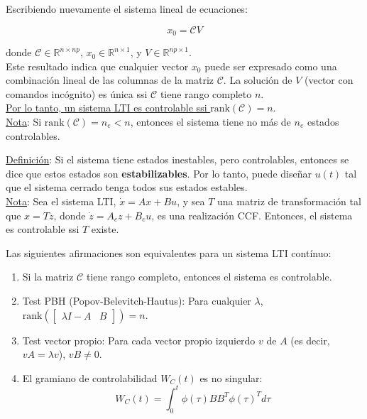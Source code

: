 Escribiendo nuevamente el sistema lineal de ecuaciones:

$$x_0 = \mathcal{C} V$$

\noindent donde $\mathcal{C} \in \mathbb{R}^{n \times np}$, $x_0 \in \mathbb{R}^{n \times 1}$, y $V \in \mathbb{R}^{np \times 1}$.\\

Este resultado indica que cualquier vector $x_0$ puede ser expresado como una combinación lineal de las columnas de la matriz $\mathcal{C}$. La solución de $V$ (vector con comandos incógnito) es única ssi  $\mathcal{C}$ tiene rango completo $n$.\\

\underline{Por lo tanto, un sistema LTI es controlable ssi $\text{rank}(\mathcal{C})=n$}. \\

\underline{Nota}: Si $\text{rank}(\mathcal{C})= n_e < n$, entonces el sistema tiene no más de $n_e$ estados controlables.\\
\par \underline{Definición}: Si el sistema tiene estados inestables, pero controlables, entonces se dice que estos estados son \textbf{estabilizables}. Por lo tanto, puede diseñar $u(t)$ tal que el sistema cerrado tenga todos sus estados estables.\\

\underline{Nota}: Sea el sistema LTI, $\dot{x}=Ax+Bu$, y sea $T$ una matriz de transformación tal que $x=Tz$, donde $\dot{z}=A_cz+B_cu$, es una realización CCF. Entonces, el sistema es controlable ssi $T$ existe.


\begin{theorem}
    Las siguientes afirmaciones son equivalentes para un sistema LTI contínuo:
    \begin{enumerate}
        \item Si la matriz $\mathcal{C}$ tiene rango completo, entonces el sistema es controlable.
        \item Test PBH (Popov-Belevitch-Hautus): Para cualquier $\lambda$, $\text{rank}\left(\begin{bmatrix}\lambda I - A & B\end{bmatrix}\right) = n$.
        \item Test vector propio: Para cada vector propio izquierdo $v$ de $A$ (es decir, $v A = \lambda v$), $v B \neq 0$.
        \item El gramiano de controlabilidad $W_C(t)$ es no singular:
        $$W_C(t) = \int_0^t \phi(\tau) B B^T \phi(\tau)^T d\tau$$
    \end{enumerate}
\end{theorem}

